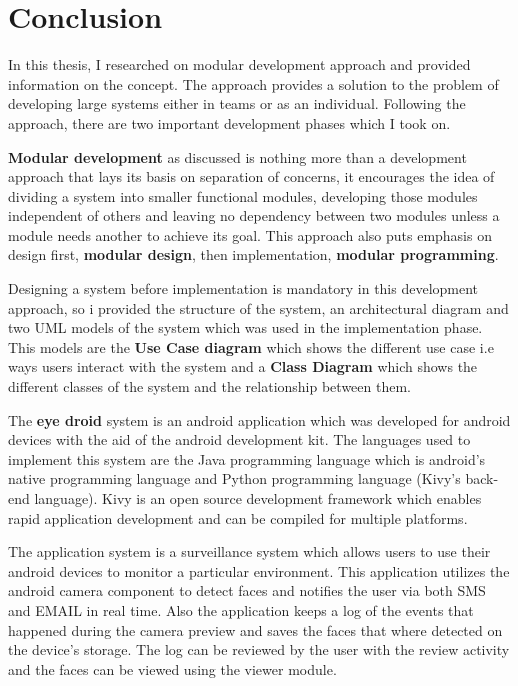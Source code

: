 \chapter{Conclusion}
In this thesis, I researched on modular development approach and provided information on the concept. The approach provides a solution to the problem of developing large systems either in teams or as an individual. Following the approach, there are two important development phases which I took on. 

{\bf Modular development} as discussed is nothing more than a development approach that lays its basis on separation of concerns, it encourages the idea of dividing a system into smaller functional modules, developing those modules independent of others and leaving no dependency between two modules unless a module needs another to achieve its goal. This approach also puts emphasis on design first, {\bf modular design}, then implementation, {\bf modular programming}.

Designing a system before implementation is mandatory in this development approach, so i provided the structure of the system, an architectural diagram and two UML models of the system which was used in the implementation phase. This models are the {\bf Use Case diagram} which shows the different use case i.e ways users interact with the system and a {\bf Class Diagram} which shows the different classes of the system and the relationship between them.

The {\bf eye droid} system is an android application which was developed for android devices with the aid of the android development kit. The languages used to implement this system are the Java  programming language which is android's native programming language and Python programming language (Kivy's back-end language). Kivy is an open source development framework which enables rapid application development and can be compiled for multiple platforms.    

The application system is a surveillance system which allows users to use their android devices to monitor a particular environment. This application utilizes the android camera component to detect faces and notifies the user via both SMS and EMAIL in real time. Also the application keeps a log of the events that happened during the camera preview and saves the faces that where detected on the device's storage. The log can be reviewed by the user with the review activity and the faces can be viewed using the viewer module.

